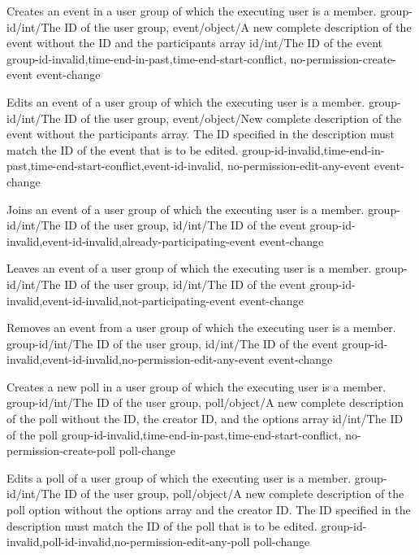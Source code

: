 \documentclass[parskip=full,11pt]{scrartcl}
\begin{document}
{Creates an event in a user group of which the executing user is a member.}
{group-id/int/The ID of the user group,
event/object/A new complete description of the event
without the ID and the participants array}
{id/int/The ID of the event}
{group-id-invalid,time-end-in-past,time-end-start-conflict,
no-permission-create-event}
{event-change}

{Edits an event of a user group of which the executing user is a member.}
{group-id/int/The ID of the user group,
event/object/New complete description of the event without the participants
array.
The ID specified in the description must match the ID of the event that
is to be edited.}
{}
{group-id-invalid,time-end-in-past,time-end-start-conflict,event-id-invalid,
no-permission-edit-any-event}
{event-change}

{Joins an event of a user group of which the executing user is a member.}
{group-id/int/The ID of the user group,
id/int/The ID of the event}
{}
{group-id-invalid,event-id-invalid,already-participating-event}
{event-change}

{Leaves an event of a user group of which the executing user is a member.}
{group-id/int/The ID of the user group,
id/int/The ID of the event}
{}
{group-id-invalid,event-id-invalid,not-participating-event}
{event-change}

{Removes an event from a user group of which the executing user is a member.}
{group-id/int/The ID of the user group,
id/int/The ID of the event}
{}
{group-id-invalid,event-id-invalid,no-permission-edit-any-event}
{event-change}

{Creates a new poll in a user group of which the executing user is a member.}
{group-id/int/The ID of the user group,
poll/object/A new complete description of the poll without the ID, the
creator ID, and the options array}
{id/int/The ID of the poll}
{group-id-invalid,time-end-in-past,time-end-start-conflict,
no-permission-create-poll}
{poll-change}

{Edits a poll of a user group of which the executing user is a member.}
{group-id/int/The ID of the user group,
poll/object/A new complete description of the poll option without
the options array and the creator ID.
The ID specified in the description must match the ID of the poll that
is to be edited.}
{}
{group-id-invalid,poll-id-invalid,no-permission-edit-any-poll}
{poll-change}
\end{document}

